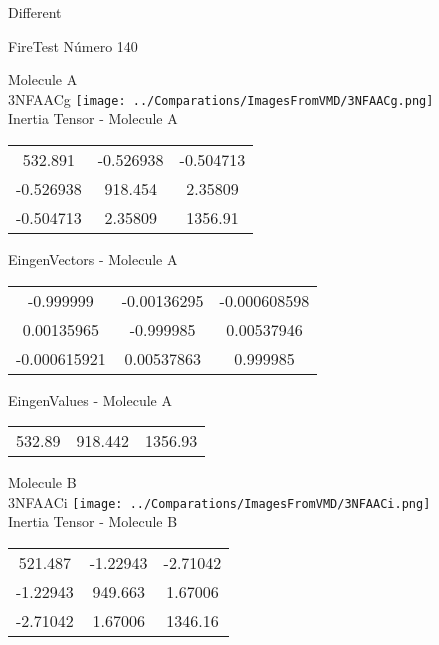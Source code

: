\begin{center}
\vtab
\vtab
\textcolor{NavyBlue}{\Large Different}
\end{center}

 \newpage

\vtab[-2cm]
\begin{center}
{\large FireTest \tab Número 140}
\end{center}
\begin{multicols}{2}
\begin{center}

Molecule A \\ 
3NFAACg
\texttt{[image: ../Comparations/ImagesFromVMD/3NFAACg.png]}
\\
Inertia Tensor - Molecule A \\
\vtab

\begin{tabular}{|c c c|}
532.891	 & 	-0.526938	 & 	-0.504713	 \\
-0.526938	 & 	918.454	 & 	2.35809	 \\
-0.504713	 & 	2.35809	 & 	1356.91
\end{tabular}

\vtab
 EingenVectors - Molecule A     \\
\vtab
\begin{tabular}{|c c c|}
-0.999999	 & 	-0.00136295	 & 	-0.000608598	 \\
0.00135965	 & 	-0.999985	 & 	0.00537946	 \\
-0.000615921	 & 	0.00537863	 & 	0.999985
\end{tabular}

\vtab
 EingenValues - Molecule A     \\
\vtab
\begin{tabular}{|c c c|}
532.89	 & 	918.442	 & 	1356.93	 \\
\end{tabular}
\columnbreak

Molecule B \\ 
3NFAACi
\texttt{[image: ../Comparations/ImagesFromVMD/3NFAACi.png]}
\\
Inertia Tensor - Molecule B \\
\vtab

\begin{tabular}{|c c c|}
521.487	 & 	-1.22943	 & 	-2.71042	 \\
-1.22943	 & 	949.663	 & 	1.67006	 \\
-2.71042	 & 	1.67006	 & 	1346.16
\end{tabular}


\end{center}
\end{multicols}
